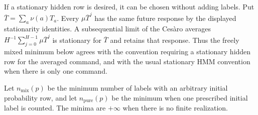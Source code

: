 If a stationary hidden row is desired, it can be chosen without adding
labels. Put $\overline T=\sum_a\nu(a)T_a$. Every $\mu\overline T^j$
has the same future response by the displayed stationarity identities.
A subsequential limit of the Ces\`aro averages
$H^{-1}\sum_{j=0}^{H-1}\mu\overline T^j$ is stationary for
$\overline T$ and retains that response. Thus the freely mixed minimum
below agrees with the convention requiring a stationary hidden row for
the averaged command, and with the usual stationary HMM convention when
there is only one command.

Let $n_{\mathrm{mix}}(p)$ be the minimum number of labels with an arbitrary
initial probability row, and let $n_{\mathrm{pure}}(p)$ be the minimum when
one prescribed initial label is counted.  The minima are $+\infty$ when
there is no finite realization.

